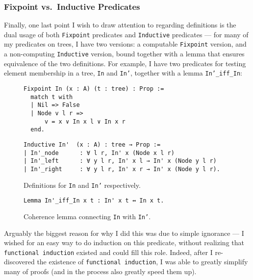 \documentclass[acmsmall, authorversion, nonacm, overload]{acmart}
\begin{document}
\subsubsection{Fixpoint vs.\ Inductive Predicates}
Finally, one last point I wish to draw attention to regarding definitions is
the dual usage of both \texttt{Fixpoint} predicates and
\texttt{Inductive} predicates --- for many of my predicates on trees,
I have two versions: a computable \texttt{Fixpoint} version, and a non-computing \texttt{Inductive} version,
bound together with a lemma that ensures equivalence of the two definitions.
For example, I have two predicates for testing element membership in a tree, \texttt{In} and \texttt{In'},
together with a lemma \texttt{In'_iff_In}:
\begin{figure}[htb!]
  \centering
  \begin{minipage}{0.45\textwidth}
    \centering
  \begin{verbatim}
Fixpoint In (x : A) (t : tree) : Prop :=
  match t with
  | Nil => False
  | Node v l r =>
      v = x ∨ In x l ∨ In x r
  end.
  \end{verbatim}
  \end{minipage}%
  \begin{minipage}{0.55\textwidth}
  \flushleft
  \begin{verbatim}
Inductive In'  (x : A) : tree → Prop :=
| In'_node      : ∀ l r, In' x (Node x l r)
| In'_left      : ∀ y l r, In' x l → In' x (Node y l r)
| In'_right     : ∀ y l r, In' x r → In' x (Node y l r).
  \end{verbatim}
  \end{minipage}%
  \centering
  \vspace{0.5em}
  \caption{Definitions for \texttt{In} and \texttt{In'} respectively.}
\end{figure}%
\begin{figure}[htb!]
  \centering
  \begin{minipage}{0.5\textwidth}
  \begin{verbatim}
Lemma In'_iff_In x t : In' x t ↔ In x t.
  \end{verbatim}
  \end{minipage}
  \caption{Coherence lemma connecting \texttt{In} with \texttt{In'}.}
\end{figure}%

\newpage
Arguably the biggest reason for why I did this was due to simple ignorance ---
I wished for an easy way to do induction on this predicate, without realizing that \texttt{functional induction}
existed and could fill this role.
Indeed, after I re-discovered the existence of \texttt{functional induction},
I was able to greatly simplify many of proofs (and in the process also greatly speed them up).
\end{document}
